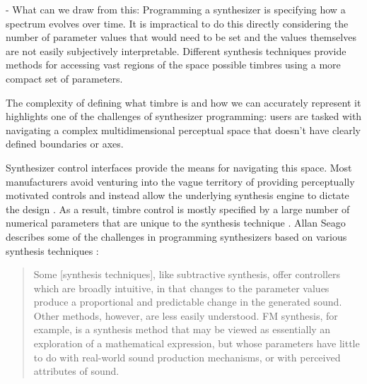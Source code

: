 - What can we draw from this: Programming a synthesizer is specifying how a spectrum evolves over time. It is impractical to do this directly considering the number of parameter values that would need to be set and the values themselves are not easily subjectively interpretable. Different synthesis techniques provide methods for accessing vast regions of the space possible timbres using a more compact set of parameters. 

The complexity of defining what timbre is and how we can accurately represent it highlights one of the challenges of synthesizer programming: users are tasked with navigating a complex multidimensional perceptual space that doesn't have clearly defined boundaries or axes. 

Synthesizer control interfaces provide the means for navigating this space. Most manufacturers avoid venturing into the vague territory of providing perceptually motivated controls and instead allow the underlying synthesis engine to dictate the design \cite{seago2004critical}. As a result, timbre control is mostly specified by a large number of numerical parameters that are unique to the synthesis technique \cite{ethington1994seawave}. Allan Seago describes some of the challenges in programming synthesizers based on various synthesis techniques \cite{seago2013new}:

\begin{quote}
    Some [synthesis techniques], like subtractive synthesis, offer controllers which are broadly intuitive, in that changes to the parameter values produce a proportional and predictable change in the generated sound. Other methods, however, are less easily understood. FM synthesis, for example, is a synthesis method that may be viewed as essentially an exploration of a mathematical expression, but whose parameters have little to do with real-world sound production mechanisms, or with perceived attributes of sound.
\end{quote}

